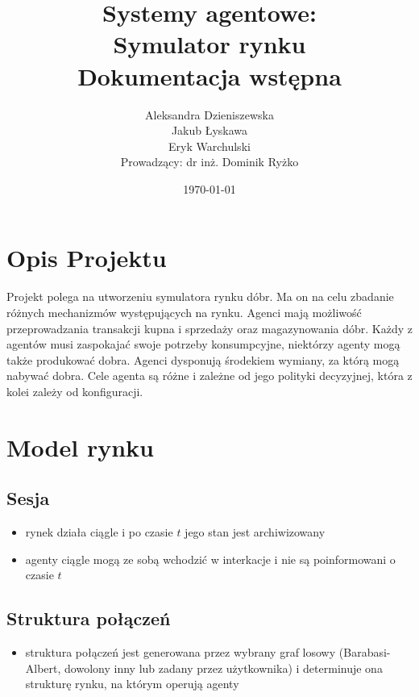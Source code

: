 \documentclass[]{article}
\date{}
\title{Systemy agentowe: \\ Symulator rynku \\ Dokumentacja wstępna}
\author{Aleksandra Dzieniszewska \\ Jakub Łyskawa \\ Eryk Warchulski \\ Prowadzący: dr inż. Dominik Ryżko}%
\date{\today}
\providecommand{\tightlist}{%
  \setlength{\itemsep}{0pt}\setlength{\parskip}{0pt}}
\begin{document}
\maketitle
\hypertarget{opis-projektu}{%
\section{Opis Projektu}\label{opis-projektu}}

Projekt polega na utworzeniu symulatora rynku dóbr. Ma on na celu
zbadanie różnych mechanizmów występujących na rynku. Agenci mają
możliwość przeprowadzania transakcji kupna i sprzedaży oraz
magazynowania dóbr. Każdy z agentów musi zaspokajać swoje potrzeby
konsumpcyjne, niektórzy agenty mogą także produkować dobra. Agenci
dysponują środekiem wymiany, za którą mogą nabywać dobra. Cele agenta są
różne i zależne od jego polityki decyzyjnej, która z kolei zależy od
konfiguracji.

\hypertarget{model-rynku}{%
\section{Model rynku}\label{model-rynku}}

\hypertarget{sesja}{%
\subsection{Sesja}\label{sesja}}

\begin{itemize}
\tightlist
\item
  rynek działa ciągle i po czasie \(t\) jego stan jest archiwizowany
\item
  agenty ciągle mogą ze sobą wchodzić w interkacje i nie są
  poinformowani o czasie \(t\)
\end{itemize}

\hypertarget{struktura-poux142ux105czeux144}{%
\subsection{Struktura połączeń}\label{struktura-poux142ux105czeux144}}

\begin{itemize}
\tightlist
\item
  struktura połączeń jest generowana przez wybrany graf losowy
  (Barabasi-Albert, dowolony inny lub zadany przez użytkownika) i
  determinuje ona strukturę rynku, na którym operują agenty
\end{itemize}
\end{document}
